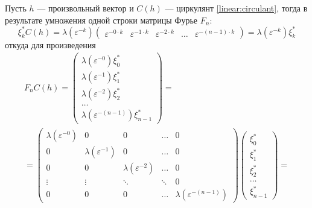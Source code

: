 Пусть $h$ --- произвольный вектор и $C(h)$ --- циркулянт \eqref{linear:circulant}, тогда в результате умножения одной строки матрицы Фурье $F_n$:
\[
    \xi_k^* C(h)
    = \lambda ( \varepsilon^{-k} ) \begin{pmatrix}
        \varepsilon^{- 0 \cdot k} & \varepsilon^{- 1 \cdot k} & \varepsilon^{- 2 \cdot k} & \dots & \varepsilon^{- (n-1) \cdot k}
    \end{pmatrix}
    = \lambda ( \varepsilon^{-k} ) \xi_k^*
\]
откуда для произведения
\begin{multline*}
    F_n C(h)
    =
    \begin{pmatrix}
        \lambda ( \varepsilon^{-0} ) \xi_0^* \\
        \lambda ( \varepsilon^{-1} ) \xi_1^* \\
        \lambda ( \varepsilon^{-2} ) \xi_2^* \\
        \dots                                \\
        \lambda ( \varepsilon^{-(n-1)} ) \xi_{n-1}^*
    \end{pmatrix} = \\
    =
    \begin{pmatrix}
        \lambda ( \varepsilon^{-0} ) & 0                            & 0                            & \dots  & 0                                \\
        0                            & \lambda ( \varepsilon^{-1} ) & 0                            & \dots  & 0                                \\
        0                            & 0                            & \lambda ( \varepsilon^{-2} ) & \dots  & 0                                \\
        \vdots                       & \vdots                       & \ddots                       & \ddots & 0                                \\
        0                            & 0                            & 0                            & \dots  & \lambda ( \varepsilon^{-(n-1)} )
    \end{pmatrix}
    \begin{pmatrix}
        \xi_0^* \\
        \xi_1^* \\
        \xi_2^* \\
        \dots   \\
        \xi_{n-1}^*
    \end{pmatrix}
    = \\

\end{multline*}
